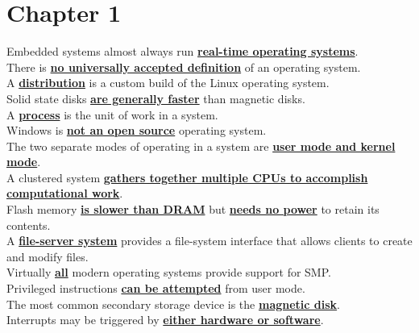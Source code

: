 \documentclass[10pt]{article}
\newcommand{\qw}[1]{\textbf{\ul{#1}}}
\begin{document}
\section*{\centering Chapter 1}
Embedded systems almost always run \qw{real-time operating systems}.\\[2mm]
There is \qw{no universally accepted definition} of an operating system.\\[2mm]
A \qw{distribution} is a custom build of the Linux operating system.\\[2mm]
Solid state disks \qw{are generally faster} than magnetic disks.\\[2mm]
A \qw{process} is the unit of work in a system.\\[2mm]
Windows is \qw{not an open source} operating system.\\[2mm]
The two separate modes of operating in a system are \qw{user mode and kernel mode}.\\[2mm]
A clustered system \qw{gathers together multiple CPUs to accomplish computational work}.\\[2mm]
Flash memory \qw{is slower than DRAM} but \qw{needs no power} to retain its contents.\\[2mm]
A \qw{file-server system} provides a file-system interface that allows clients to create and modify files.\\[2mm]
Virtually \qw{all} modern operating systems provide support for SMP.\\[2mm]
Privileged instructions \qw{can be attempted} from user mode.\\[2mm]
The most common secondary storage device is the \qw{magnetic disk}.\\[2mm]
Interrupts may be triggered by \qw{either hardware or software}.
\newpage
\end{document}
